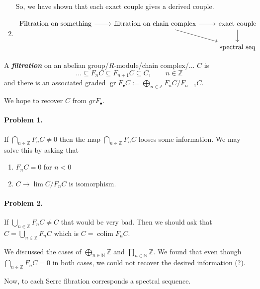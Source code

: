 \documentclass{article}
\newcommand{\N}{\mathbb{N}}
\newcommand{\Z}{\mathbb{Z}}
\DeclareMathOperator{\gr}{gr}
\DeclareMathOperator{\colim}{colim}
\begin{document}
\begin{enumerate}
	 {\color{azure}So, we have shown that each exact couple gives a derived couple.}
	

	
	\item \[\begin{tikzcd}
		\text{Filtration on something}\arrow[r]&\text{filtration on chain complex}\arrow[r]\arrow[dr]&\text{exact couple}\arrow[d]\\
		&&\text{spectral seq}
	\end{tikzcd}\]
\end{enumerate}
A \textbf{\textit{filtration}} on an abelian group/$R$-module/chain complex/... $C$ is
\[\ldots\subseteq F_nC\subseteq F_{n+1}C\subseteq C,\qquad n\in\Z\]
and there is an associated graded $\gr F_\bullet C:=\bigoplus_{n\in\Z}F_nC/F_{n-1}C$.

{\color{magenta}We hope to recover $C$ from $gr F_\bullet$.}

\paragraph{Problem 1.} If $\bigcap_{n\in\Z}F_nC\neq0$ then the map $\bigcap_{n\in\Z}F_nC$ looses some information. We may solve this by asking that
\begin{enumerate}
	\item $F_nC=0$ for $n<0$
	\item $C\to\lim C/F_nC$ is isomorphism.
\end{enumerate}
\paragraph{Problem 2.} If $\bigcup_{n\in\Z}F_nC\neq C$ that would be very bad. Then we should ask that $C=\bigcup_{n\in\Z}F_nC$ which is $C=\colim F_nC$.
\begin{example}
	We discussed the cases of $\bigoplus_{n\in\N}\Z$ and $\prod_{n\in\N}\Z$. We found that even though $\bigcap_{n\in\Z}F_nC=0$ in both cases, we could not recover the desired information (?).
\end{example}
Now, to each Serre fibration corresponds a spectral sequence.
\end{document}
